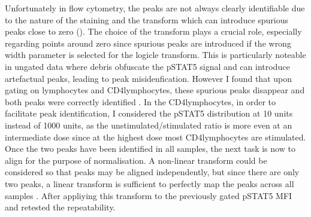 Unfortunately in flow cytometry, the peaks are not always clearly identifiable due to the nature of the staining and the transform which can introduce
spurious peaks close to zero ().
The choice of the transform plays a crucial role, especially regarding points around zero since spurious peaks are introduced if the wrong width parameter is selected
for the logicle transform.
This is particularly noteable in ungated data where debris obfuscate the pSTAT5 signal and can introduce artefactual peaks,
leading to peak misidenfication.
However I found that upon gating on lymphocytes and CD4\positive lymphocytes, these spurious peaks disappear and both peaks were correctly identified 
.
In the CD4\positive lymphocytes, in order to facilitate peak identification, I considered the pSTAT5 distribution at 10 units instead of 1000 units,
as the unstimulated/stimulated ratio is more even at an intermediate dose since at the highest dose most CD4\positive lymphocytes are stimulated.
Once the two peaks have been identified in all samples, the next task is now to align for the purpose of normalisation.
A non-linear transform could be considered so that peaks may be aligned independently, but since there are only two peaks,
a linear transform is sufficient to perfectly map the peaks across all samples .
After appliying this transform to the previously gated pSTAT5 MFI and retested the repeatability.



